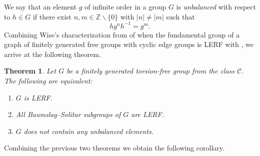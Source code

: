 \documentclass[a4paper]{amsart}
\newtheorem{teo}[lem]{Theorem}
\theoremstyle{definition}
\theoremstyle{remark}
\begin{document}
We say that an element \(g\) of infinite order in a group \(G\) is \emph{unbalanced} with respect to \(h \in G\) if there exist \(n, m \in \mathbb{Z} \smallsetminus \{0\}\) with \(|n| \neq |m|\) such that
\[hg^n h^{-1} = g^m.\] Combining Wise’s characterization from \cite[Thm. 5.1]{wiseSubgroupSeparabilityGraphs2000} of when the fundamental group of a graph of finitely generated free groups with cyclic edge groups is LERF with \cite[Prop. 3.6]{AM24}, we arrive at the following theorem.
 
\begin{teo}\label{Wise}
Let \(G\) be a finitely generated torsion-free group from the class \(\mathcal{C}\). The following are equivalent:
\begin{enumerate}
    \item \(G\) is LERF.
    \item All Baumslag--Solitar subgroups of \(G\) are LERF.
    \item \(G\) does not contain any unbalanced elements.
\end{enumerate}
\end{teo}

Combining the previous two theorems we obtain the following corollary.
\end{document}
